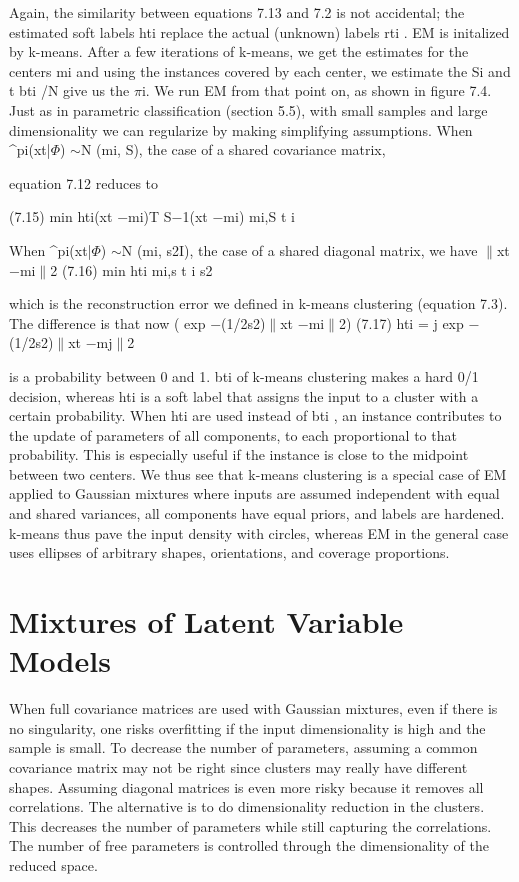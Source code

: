Again, the similarity between equations 7.13 and 7.2 is not accidental; the estimated soft labels hti replace the actual (unknown) labels rti . EM is initalized by k-means. After a few iterations of k-means, we get the estimates for the centers mi and using the instances covered by each center, we estimate the Si and t bti /N give us the $\pi$i. We run EM from that point on, as shown in figure 7.4. Just as in parametric classification (section 5.5), with small samples and large dimensionality we can regularize by making simplifying assumptions. When \textasciicircum{}pi(xt|$\Phi$) $\sim$N (mi, S), the case of a shared covariance matrix,

equation 7.12 reduces to

(7.15) min hti(xt $-$mi)T S$-$1(xt $-$mi) mi,S t i

When \textasciicircum{}pi(xt|$\Phi$) $\sim$N (mi, s2I), the case of a shared diagonal matrix, we have $\parallel$xt $-$mi$\parallel$2 (7.16) min hti mi,s t i s2

which is the reconstruction error we defined in k-means clustering (equation 7.3). The difference is that now ( exp $-$(1/2s2)$\parallel$xt $-$mi$\parallel$2) (7.17) hti = j exp $-$(1/2s2)$\parallel$xt $-$mj$\parallel$2

is a probability between 0 and 1. bti of k-means clustering makes a hard 0/1 decision, whereas hti is a soft label that assigns the input to a cluster with a certain probability. When hti are used instead of bti , an instance contributes to the update of parameters of all components, to each proportional to that probability. This is especially useful if the instance is close to the midpoint between two centers. We thus see that k-means clustering is a special case of EM applied to Gaussian mixtures where inputs are assumed independent with equal and shared variances, all components have equal priors, and labels are hardened. k-means thus pave the input density with circles, whereas EM in the general case uses ellipses of arbitrary shapes, orientations, and coverage proportions.

\section{Mixtures of Latent Variable Models}

When full covariance matrices are used with Gaussian mixtures, even if there is no singularity, one risks overfitting if the input dimensionality is high and the sample is small. To decrease the number of parameters, assuming a common covariance matrix may not be right since clusters may really have different shapes. Assuming diagonal matrices is even more risky because it removes all correlations. The alternative is to do dimensionality reduction in the clusters. This decreases the number of parameters while still capturing the correlations. The number of free parameters is controlled through the dimensionality of the reduced space.

